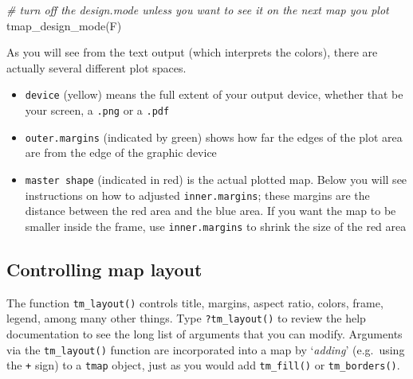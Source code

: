\documentclass[
]{book}
\newenvironment{Shaded}{\begin{snugshade}}{\end{snugshade}}
\newcommand{\CommentTok}[1]{\textcolor[rgb]{0.56,0.35,0.01}{\textit{#1}}}
\newcommand{\FunctionTok}[1]{\textcolor[rgb]{0.00,0.00,0.00}{#1}}
\newcommand{\NormalTok}[1]{#1}
\providecommand{\tightlist}{%
  \setlength{\itemsep}{0pt}\setlength{\parskip}{0pt}}
\begin{document}
\begin{Shaded}
\begin{Highlighting}[]
\CommentTok{\# turn off the design.mode unless you want to see it on the next map you plot}
\FunctionTok{tmap\_design\_mode}\NormalTok{(F)}
\end{Highlighting}
\end{Shaded}

As you will see from the text output (which interprets the colors), there are actually several different plot spaces.

\begin{itemize}
\tightlist
\item
  \texttt{device} (yellow) means the full extent of your output device, whether that be your screen, a \texttt{.png} or a \texttt{.pdf}
\item
  \texttt{outer.margins} (indicated by green) shows how far the edges of the plot area are from the edge of the graphic device
\item
  \texttt{master\ shape} (indicated in red) is the actual plotted map. Below you will see instructions on how to adjusted \texttt{inner.margins}; these margins are the distance between the red area and the blue area. If you want the map to be smaller inside the frame, use \texttt{inner.margins} to shrink the size of the red area
\end{itemize}

\hypertarget{controlling-map-layout}{%
\subsection{Controlling map layout}\label{controlling-map-layout}}

The function \texttt{tm\_layout()} controls title, margins, aspect ratio, colors, frame, legend, among many other things. Type \texttt{?tm\_layout()} to review the help documentation to see the long list of arguments that you can modify. Arguments via the \texttt{tm\_layout()} function are incorporated into a map by `\emph{adding}' (e.g.~using the \texttt{+} sign) to a \texttt{tmap} object, just as you would add \texttt{tm\_fill()} or \texttt{tm\_borders()}.
\end{document}
